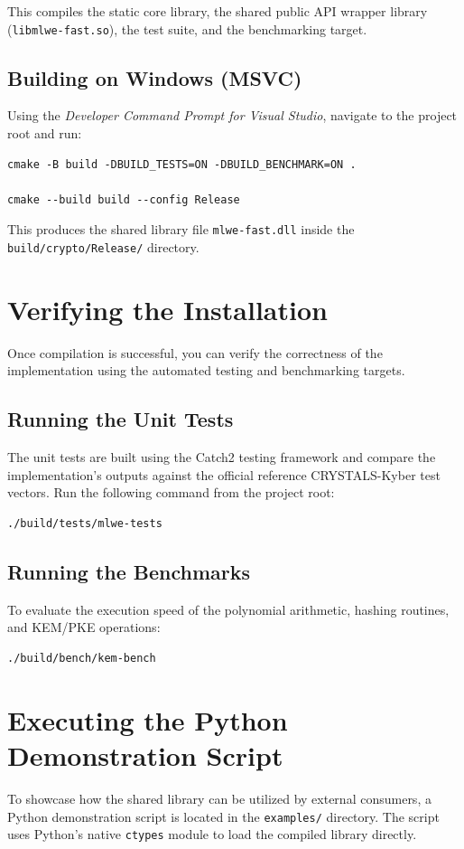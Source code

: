 \documentclass[12pt,a4paper]{article}
\begin{document}
This compiles the static core library, the shared public API wrapper library (\texttt{libmlwe-fast.so}), the test suite, and the benchmarking target.

\subsection{Building on Windows (MSVC)}
Using the \textit{Developer Command Prompt for Visual Studio}, navigate to the project root and run:

\begin{lstlisting}
cmake -B build -DBUILD_TESTS=ON -DBUILD_BENCHMARK=ON .

cmake --build build --config Release
\end{lstlisting}

This produces the shared library file \texttt{mlwe-fast.dll} inside the \texttt{build/crypto/Release/} directory.

\section{Verifying the Installation}
Once compilation is successful, you can verify the correctness of the implementation using the automated testing and benchmarking targets.

\subsection{Running the Unit Tests}
The unit tests are built using the Catch2 testing framework and compare the implementation's outputs against the official reference CRYSTALS-Kyber test vectors. Run the following command from the project root:

\begin{lstlisting}
./build/tests/mlwe-tests
\end{lstlisting}

\subsection{Running the Benchmarks}
To evaluate the execution speed of the polynomial arithmetic, hashing routines, and KEM/PKE operations:

\begin{lstlisting}
./build/bench/kem-bench
\end{lstlisting}

\section{Executing the Python Demonstration Script}
To showcase how the shared library can be utilized by external consumers, a Python demonstration script is located in the \texttt{examples/} directory. The script uses Python's native \texttt{ctypes} module to load the compiled library directly.
\end{document}
